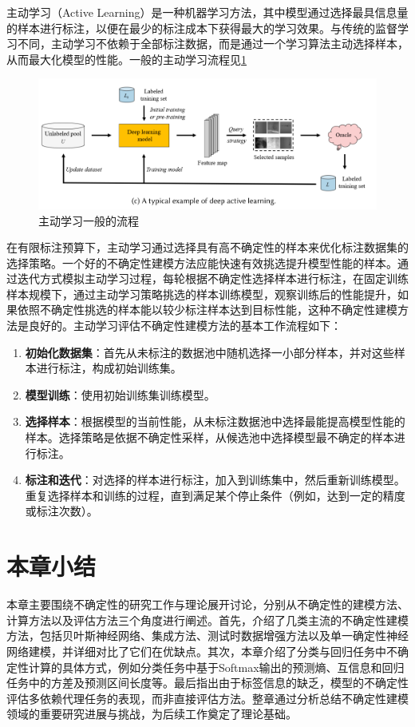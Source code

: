 主动学习（Active Learning）\cite{ren2021survey}\cite{settles2009active}是一种机器学习方法，其中模型通过选择最具信息量的样本进行标注，以便在最少的标注成本下获得最大的学习效果。与传统的监督学习不同，主动学习不依赖于全部标注数据，而是通过一个学习算法主动选择样本，从而最大化模型的性能。一般的主动学习流程见\ref{fig:al}
\begin{figure}[h]
    \captionsetup{font=small, justification=centering}
    \centering
    \includegraphics[width=0.9\linewidth]{assets/activelearning.png}
    \caption{主动学习一般的流程\cite{ren2021survey}}
    \label{fig:al}
\end{figure}

在有限标注预算下，主动学习通过选择具有高不确定性的样本来优化标注数据集的选择策略。一个好的不确定性建模方法应能快速有效挑选提升模型性能的样本。通过迭代方式模拟主动学习过程，每轮根据不确定性选择样本进行标注，在固定训练样本规模下，通过主动学习策略挑选的样本训练模型，观察训练后的性能提升，如果依照不确定性挑选的样本能以较少标注样本达到目标性能，这种不确定性建模方法是良好的。主动学习评估不确定性建模方法的基本工作流程如下：

\begin{enumerate}[nosep]
    \item \textbf{初始化数据集}：首先从未标注的数据池中随机选择一小部分样本，并对这些样本进行标注，构成初始训练集。
    \item \textbf{模型训练}：使用初始训练集训练模型。
    \item \textbf{选择样本}：根据模型的当前性能，从未标注数据池中选择最能提高模型性能的样本。选择策略是依据不确定性采样，从候选池中选择模型最不确定的样本进行标注。
    \item \textbf{标注和迭代}：对选择的样本进行标注，加入到训练集中，然后重新训练模型。重复选择样本和训练的过程，直到满足某个停止条件（例如，达到一定的精度或标注次数）。
\end{enumerate}

\section{本章小结}
本章主要围绕不确定性的研究工作与理论展开讨论，分别从不确定性的建模方法、计算方法以及评估方法三个角度进行阐述。首先，介绍了几类主流的不确定性建模方法，包括贝叶斯神经网络、集成方法、测试时数据增强方法以及单一确定性神经网络建模，并详细对比了它们在优缺点。其次，本章介绍了分类与回归任务中不确定性计算的具体方式，例如分类任务中基于Softmax输出的预测熵、互信息和回归任务中的方差及预测区间长度等。最后指出由于标签信息的缺乏，模型的不确定性评估多依赖代理任务的表现，而非直接评估方法。整章通过分析总结不确定性建模领域的重要研究进展与挑战，为后续工作奠定了理论基础。

